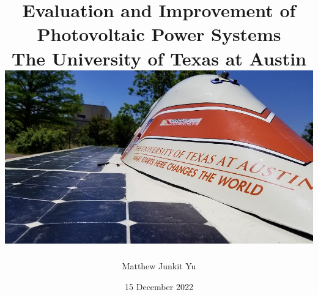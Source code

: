 \documentclass[12pt]{report}
\begin{document}
\title {
    {Evaluation and Improvement of Photovoltaic Power Systems}\\
    {\large The University of Texas at Austin}\\
    {\includegraphics[width=\textwidth]{lonestar_cover.jpg}}
}
\author{Matthew Junkit Yu}
\date{15 December 2022}
\maketitle

\tableofcontents







\printbibliography
\listoftodos[TODOS]
\end{document}
